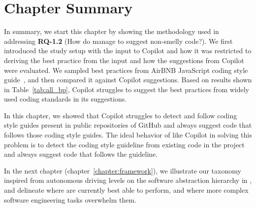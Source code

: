 \section{Chapter Summary}
In summary, we start this chapter by showing the methodology used in addressing \textbf{RQ-1.2} (How do \cct{} manage to suggest non-smelly code?). We first introduced the study setup with the input to Copilot and how it was restricted to deriving the best practice from the input and how the suggestions from Copilot were evaluated. We sampled best practices from AirBNB JavaScript coding style guide~\cite{airbnb_code}, and then compared it against Copilot suggestions. Based on results shown in Table~\ref{tab:all_bp}, Copilot struggles to suggest the best practices from widely used coding standards in its suggestions. 

In this chapter, we showed that Copilot struggles to detect and follow coding style guides  present in public repositories of GitHub and always suggest code that follows those coding style guides. The ideal behavior of \cct{} like Copilot in solving this problem is to detect the coding style guideline from existing code in the project and always suggest code that follows the guideline.

In the next chapter (chapter~\ref{chapter:framework}), we illustrate our taxonomy inspired from autonomous driving levels on the software abstraction hierarchy in \AISE{}, and delineate where \cct{} are currently best able to perform, and where more complex software engineering tasks overwhelm them.